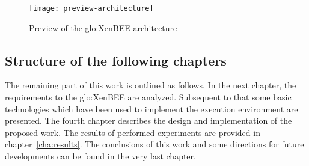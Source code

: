\begin{figure}[ht]
  \centering
  \texttt{[image: preview-architecture]}
  \caption{Preview of the \gls{glo:XenBEE} architecture}
  \label{fig:preview-architecture}
\end{figure}

\subsection*{Structure of the following chapters}

The  remaining part  of this  work is  outlined as  follows.  In  the next
chapter, the requirements to the \gls{glo:XenBEE} are analyzed. Subsequent
to  that some basic  technologies which  have been  used to  implement the
execution  environment are  presented.  The  fourth chapter  describes the
design and implementation of the  proposed work.  The results of performed
experiments are provided in chapter~\ref{cha:results}.  The conclusions of
this work and some directions for  future developments can be found in the
very last chapter.

